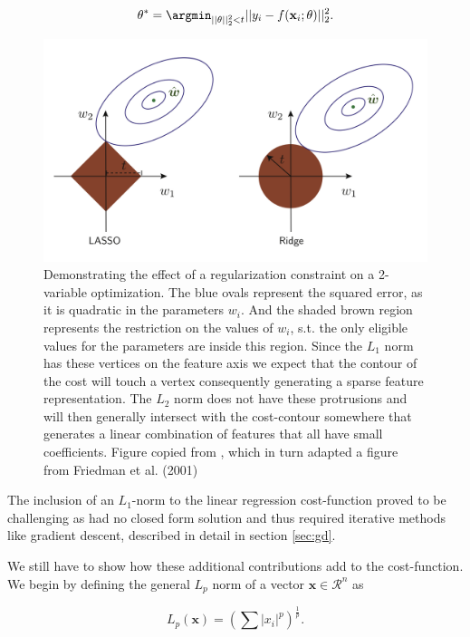 \begin{align}
\theta^* = \argmin_{||\theta||_2^2<t} ||y_i - f(\mathbf{x}_i; \theta)||_2^2.
\end{align}

\begin{figure}
\centering
\includegraphics[width=\textwidth]{../figures/regularization}
\caption[Geometric interpretation of the $L_1$ and $L_2$ regularization and the squared error cost]{Demonstrating the effect of a regularization constraint on a 2-variable optimization. The blue ovals represent the squared error, as it is quadratic in the parameters $w_i$. And the shaded brown region represents the restriction on the values of $w_i$, s.t. the only eligible values for the parameters are inside this region. Since the $L_1$ norm has these vertices on the feature axis we expect that the contour of the cost will touch a vertex consequently generating a sparse feature representation. The $L_2$ norm does not have these protrusions and will then generally intersect with the cost-contour somewhere that generates a linear combination of features that all have small coefficients. Figure copied from \citet{Mehta2019}, which in turn adapted a figure from Friedman et al. (2001)}\label{fig:regularization}
\end{figure}

The inclusion of an $L_1$-norm to the linear regression cost-function proved to be challenging as had no closed form solution and thus required iterative methods like gradient descent, described in detail in section \ref{sec:gd}. 

We still have to show how these additional contributions add to the cost-function. We begin by defining the general $L_p$ norm of a vector $\mathbf{x} \in \mathcal{R}^n$ as

\begin{equation}
L_p(\mathbf{x}) = \left(\sum |x_i|^p\right)^{\frac{1}{p}}.
\end{equation}

